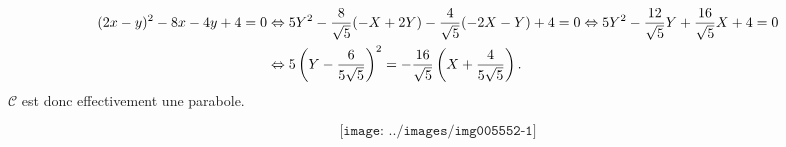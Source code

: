 {{\begin{align*}\ensuremath
(2x-y)^2-8x-4y+4=0&\Leftrightarrow5Y^2-\frac{8}{\sqrt{5}}(-X+2Y)-\frac{4}{\sqrt{5}}(-2X-Y)+4=0\Leftrightarrow5Y^2-\frac{12}{\sqrt{5}}Y+\frac{16}{\sqrt{5}}X+4=0\\
 &\Leftrightarrow5\left(Y-\frac{6}{5\sqrt{5}}\right)^2=-\frac{16}{\sqrt{5}}\left(X+\frac{4}{5\sqrt{5}}\right).
\end{align*}
$\mathcal{C}$ est donc effectivement une parabole.

$$\texttt{[image: ../images/img005552-1]}$$
}
}
